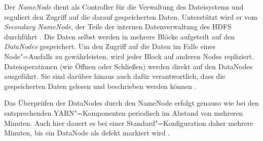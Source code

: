 Der \emph{NameNode} dient als Controller für die Verwaltung des Dateisystems und reguliert den Zugriff auf die darauf gespeicherten Daten.
Unterstützt wird er vom \emph{Secondary NameNode}, der Teile der internen Datenverwaltung des HDFS durchführt \cite{HadoopHdfsGuide271}.
Die Daten selbst werden in mehrere Blöcke aufgeteilt auf den \emph{DataNodes} gespeichert.
Um den Zugriff auf die Daten im Falle eines Node"=Ausfalls zu gewährleisten, wird jeder Block auf anderen Nodes repliziert.
Dateioperationen (wie Öffnen oder Schließen) werden direkt auf den DataNodes ausgeführt.
Sie sind darüber hinaus auch dafür verantwortlich, dass die gespeicherten Daten gelesen und beschrieben werden können \cite{Shvachko2010,HadoopHdfsDesc271}.

Das Überprüfen der DataNodes durch den NameNode erfolgt genauso wie bei den entsprechenden YARN"=Komponenten periodisch im Abstand von mehreren Minuten.
Auch hier dauert es bei einer Standard"=Konfiguration daher mehrere Minuten, bis ein DataNode als defekt markiert wird \cite{HadoopHdfsConfig271}.
